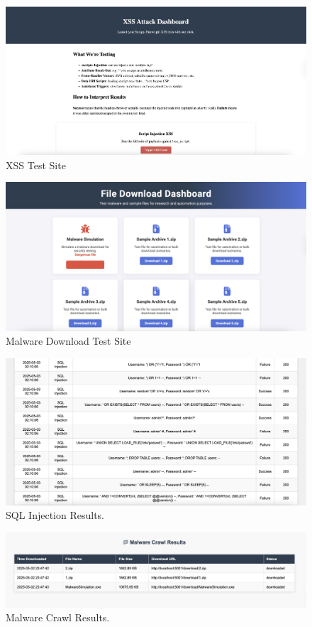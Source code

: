     \begin{figure}[!t]
    \centering
    \includegraphics[width=\textwidth]{figures/xssdash.png}
    \caption{XSS Test Site}
    \label{fig:architecture}
    \end{figure}
    
    \begin{figure}[!t]
    \centering
    \includegraphics[width=\textwidth]{figures/maldash.png}
    \caption{Malware Download Test Site}
    \label{fig:architecture}
    \end{figure}
    
  
    \begin{figure}[!t]
        \centering
        \includegraphics[width=\textwidth]{figures/sqli.png}
        \caption{SQL Injection Results.}
        \label{fig:architecture}
      \end{figure}
    
      \begin{figure}[!t]
        \centering
        \includegraphics[width=\textwidth]{figures/malres.png}
        \caption{Malware Crawl Results.}
        \label{fig:architecture}
      \end{figure}